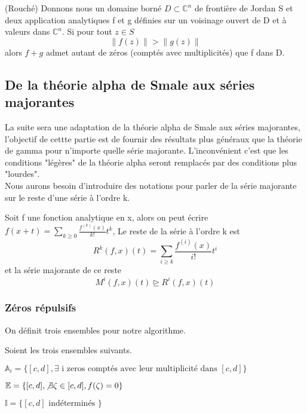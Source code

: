 \documentclass[a4paper,10.5pt]{article}
\begin{document}
	\begin{theorem}(Rouché) Donnons nous un domaine borné $D \subset \mathbb{C}^{n}$ de frontière de Jordan S et deux application analytiques f et g définies sur un voisinage ouvert de D et à valeurs dans $\mathbb{C}^n$. Si pour tout $z \in S$ 
	\[\left\|f(z)\right\|>\left\|g(z)\right\|\]
	alors $f+g$ admet autant de zéros (comptés avec multiplicités) que f dans D.
	\end{theorem}
	
	
	\subsection{De la théorie alpha de Smale aux séries majorantes}
	
	La suite sera une adaptation de la théorie alpha de Smale aux séries majorantes, l'objectif de cettte partie est de fournir des résultats plus généraux que la théorie de gamma pour n'importe quelle série majorante. L'inconvénient c'est que les conditions "légères" de la théorie alpha seront remplacés par des conditions plus "lourdes". \\
	Nous aurons besoin d'introduire des notations pour parler de la série majorante sur le reste d'une série à l'ordre k.
	
	\begin{definition} Soit f une fonction analytique en x, alors on peut écrire $f(x+t)=\sum_{k \geq 0} \frac{f^{(k)}(x)}{k!}t^{k}$, Le reste de la série à l'ordre k est 
	\[R^{k}(f,x)(t)=\sum_{i \geq k} \frac{f^{(i)}(x)}{i!}t^{i}\]
	et la série majorante de ce reste
	\[M^{i}(f,x)(t) \unrhd R^{i}(f,x)(t)\]
	\end{definition}
	
	\subsubsection{Zéros répulsifs}
	On définit trois ensembles pour notre algorithme.
	\begin{definition} Soient les trois ensembles suivants.
		
	$\mathbb{A}_i=\{[c,d], \exists \text{ i zeros comptés avec leur multiplicité dans } [c,d]\}$
	
	$\mathbb{E}=\{[c,d], \not\exists \zeta \in [c,d], f(\zeta)=0\}$
	
	$\mathbb{I}=\{[c,d] \text{ indéterminés }\}$\\
	\end{definition}
\end{document}
